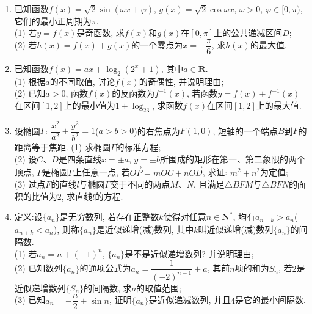 \documentclass[10pt,a4paper]{article}
\begin{document}
\begin{enumerate}[1.]
\begin{center}
\end{center}
(1) 若三棱柱$ABC-A_1B_1C_1$的体积为$3\sqrt 3$, 求三棱柱$ABC-A_1B_1C_1$的高;\\
(2) 若$C_1C=2$, 求二面角$D-B_1C_1-A_1$的大小.
\item 已知函数$f(x)=\sqrt 2\sin (\omega x+\varphi)$, $g(x)=\sqrt 2\cos \omega x$, $\omega >0$, $\varphi \in [0,\pi)$, 它们的最小正周期为$\pi$.\\
(1) 若$y=f(x)$是奇函数, 求$f(x)$和$g(x)$在$[0,\pi]$上的公共递减区间$D$;\\
(2) 若$h(x)=f(x)+g(x)$的一个零点为$x=-\dfrac{\pi}6$, 求$h(x)$的最大值.
\item 已知函数$f(x)=ax+\log_2(2^x+1)$, 其中$a\in \mathbf{R}$.\\
(1) 根据$a$的不同取值, 讨论$f(x)$的奇偶性, 并说明理由;\\
(2) 已知$a>0$, 函数$f(x)$的反函数为$f^{-1}(x)$, 若函数$y=f(x)+f^{-1}(x)$在区间$[1,2]$上的最小值为$1+\log_23$, 求函数$f(x)$在区间$[1,2]$上的最大值.
\item 设椭圆$\Gamma$: $\dfrac{x^2}{a^2}+\dfrac{y^2}{b^2}=1$($a>b>0$)的右焦点为$F(1,0)$, 短轴的一个端点$B$到$F$的距离等于焦距.
(1) 求椭圆$\Gamma$的标准方程;\\
(2) 设$C$、$D$是四条直线$x=\pm a$, $y=\pm b$所围成的矩形在第一、第二象限的两个顶点, $P$是椭圆$\Gamma$上任意一点, 若$\overrightarrow{OP}=m\overrightarrow{OC}+n\overrightarrow{OD}$, 求证: $m^2+n^2$为定值;\\
(3) 过点$F$的直线$l$与椭圆$\Gamma$交于不同的两点$M$、$N$, 且满足$\triangle BFM$与$\triangle BFN$的面积的比值为$2$, 求直线$l$的方程.
\item 定义:设$\{a_n\}$是无穷数列, 若存在正整数$k$使得对任意$n\in \mathbf{N}^*$, 均有$a_{n+k}>a_n$($a_{n+k}<a_n$), 则称$\{a_n\}$是近似递增(减)数列, 其中$k$叫近似递增(减)数列$\{a_n\}$的间隔数.\\
(1) 若$a_n=n+(-1)^n$, $\{a_n\}$是不是近似递增数列? 并说明理由;\\
(2) 已知数列$\{a_n\}$的通项公式为$a_n=\dfrac 1{(-2)^{n-1}}+a$, 其前$n$项的和为$S_n$, 若$2$是近似递增数列$\{S_n\}$的间隔数, 求$a$的取值范围;\\
(3) 已知$a_n=-\dfrac n2+\sin n$, 证明$\{a_n\}$是近似递减数列, 并且$4$是它的最小间隔数.





\end{enumerate}
\end{document}
